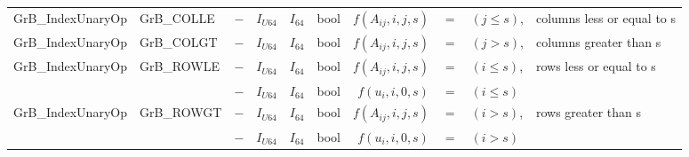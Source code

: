 \begin{landscape}
\begin{table}
\begin{threeparttable}
\begin{tabular}{l|l|cccc|rcll}
{\sf GrB\_IndexUnaryOp}   & {\sf GrB\_COLLE}   & $-$ & $I_{U64}$ & $I_{64}$ & {\sf bool} & $f(A_{ij},i,j,s)$ & $=$ & $(j \leq s)$, & columns less or equal to s \\
{\sf GrB\_IndexUnaryOp}   & {\sf GrB\_COLGT}   & $-$ & $I_{U64}$ & $I_{64}$ & {\sf bool} & $f(A_{ij},i,j,s)$ & $=$ & $(j >    s)$, & columns greater than s \\
{\sf GrB\_IndexUnaryOp}   & {\sf GrB\_ROWLE}   & $-$ & $I_{U64}$ & $I_{64}$ & {\sf bool} & $f(A_{ij},i,j,s)$ & $=$ & $(i \leq s)$, & rows less or equal to s \\
                          &                    & $-$ & $I_{U64}$ & $I_{64}$ & {\sf bool} & $f(u_{i}, i,0,s)$ & $=$ & $(i \leq s)$  \\
{\sf GrB\_IndexUnaryOp}   & {\sf GrB\_ROWGT}   & $-$ & $I_{U64}$ & $I_{64}$ & {\sf bool} & $f(A_{ij},i,j,s)$ & $=$ & $(i >    s)$, & rows greater than s \\
                          &                    & $-$ & $I_{U64}$ & $I_{64}$ & {\sf bool} & $f(u_{i}, i,0,s)$ & $=$ & $(i >    s)$ \\
\hline
                     

\end{tabular}
\end{threeparttable}
\end{table}
\end{landscape}
